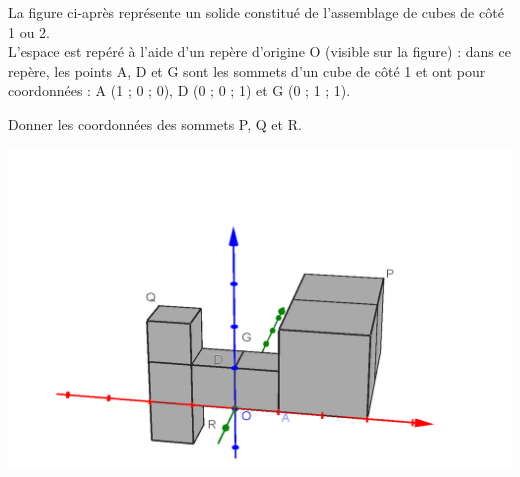 
La figure ci-après représente un solide constitué de l’assemblage de cubes de côté 1 ou 2.\\
L’espace est repéré à l’aide d’un repère d’origine O (visible sur la figure) : dans ce repère, les
points A, D et G sont les sommets d’un cube de côté 1 et ont pour coordonnées : A (1 ; 0 ; 0),
D (0 ; 0 ; 1) et G (0 ; 1 ; 1).

Donner les coordonnées des sommets P, Q et R.

\includegraphics[scale=0.3]{RepE-flash4.png} 



